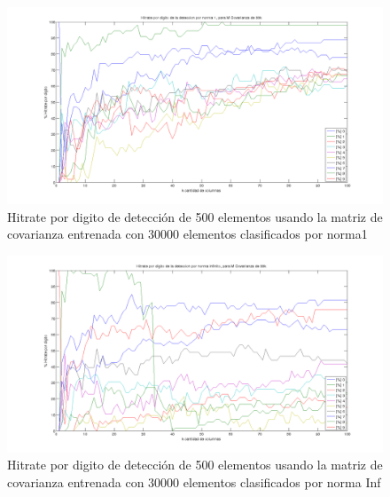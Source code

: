 \begin{figure}[H]
\begin {center}
\includegraphics[width=400pt]{plots/pordig-30kcv-norma1.png}
\end {center}
\caption{Hitrate por digito de detecci\'on de 500 elementos usando la matriz de covarianza entrenada con 30000 elementos
clasificados por norma1}
\label{fig:HRD30kcv-n1}
\end{figure}

\begin{figure}[H]
\begin {center}
\includegraphics[width=400pt]{plots/pordig-30kcv-normainf.png}
\end {center}
\caption{Hitrate por digito de detecci\'on de 500 elementos usando la matriz de covarianza entrenada con 30000 elementos
clasificados por norma Inf}
\label{fig:HRD30kcv-ninf}
\end{figure}

